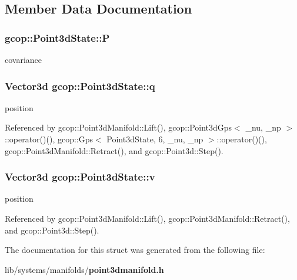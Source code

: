 \subsection{\-Member \-Data \-Documentation}
\subsubsection[{\-P}]{ {\bf gcop\-::\-Point3d\-State\-::\-P}}\label{structgcop_1_1Point3dState_a5bebf4c2e7dba4be6cf614cda24839bc}


covariance 

\subsubsection[{q}]{\setlength{\rightskip}{0pt plus 5cm}\-Vector3d {\bf gcop\-::\-Point3d\-State\-::q}}\label{structgcop_1_1Point3dState_a6277c6e634878579c6937c00156173c9}


position 



\-Referenced by gcop\-::\-Point3d\-Manifold\-::\-Lift(), gcop\-::\-Point3d\-Gps$<$ \-\_\-nu, \-\_\-np $>$\-::operator()(), gcop\-::\-Gps$<$ Point3d\-State, 6, \-\_\-nu, \-\_\-np $>$\-::operator()(), gcop\-::\-Point3d\-Manifold\-::\-Retract(), and gcop\-::\-Point3d\-::\-Step().

\subsubsection[{v}]{\setlength{\rightskip}{0pt plus 5cm}\-Vector3d {\bf gcop\-::\-Point3d\-State\-::v}}\label{structgcop_1_1Point3dState_a76a73ca0aff5d0d8298fb3a821698798}


position 



\-Referenced by gcop\-::\-Point3d\-Manifold\-::\-Lift(), gcop\-::\-Point3d\-Manifold\-::\-Retract(), and gcop\-::\-Point3d\-::\-Step().



\-The documentation for this struct was generated from the following file\-:\begin{DoxyCompactItemize}
\item 
lib/systems/manifolds/{\bf point3dmanifold.\-h}\end{DoxyCompactItemize}
